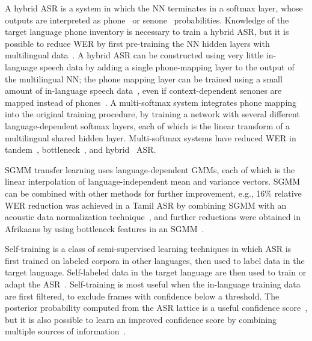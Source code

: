 A hybrid ASR is a system in which the NN terminates in a softmax
layer, whose outputs are interpreted as phone~\cite{Morgan95} or
senone~\cite{Dahl2012} probabilities.  Knowledge of the target
language phone inventory is necessary to train a hybrid ASR, but it is
possible to reduce WER by first pre-training the NN hidden layers with
multilingual data~\cite{Huang2013,Swietojanski2012}.  A hybrid ASR can be
constructed using very little in-language speech data by adding a
single phone-mapping layer to the output of the multilingual NN; the
phone mapping layer can be trained using a small amount of in-language
speech data~\cite{Sim2008}, even if context-dependent senones are
mapped instead of phones~\cite{Do2012}.  A multi-softmax system
integrates phone mapping into the original training procedure, by
training a network with several different language-dependent softmax
layers, each of which is the linear transform of a multilingual shared
hidden layer.  Multi-softmax systems have reduced WER in
tandem~\cite{Scanzio2008}, bottleneck~\cite{Vesely2012}, and
hybrid~\cite{Huang2013} ASR.

SGMM transfer learning uses language-dependent GMMs, each of which is
the linear interpolation of language-independent mean and variance
vectors.  SGMM can be combined with other methods for further
improvement, e.g., 16\% relative WER reduction was achieved in a Tamil
ASR by combining SGMM with an acoustic data normalization
technique~\cite{Mohan2014}, and further reductions were obtained in
Afrikaans by using bottleneck features in an SGMM~\cite{Imseng2014}.

Self-training is a class of semi-supervised learning techniques in
which ASR is first trained on labeled corpora in other languages, then
used to label data in the target language.  Self-labeled data in the
target language are then used to train or adapt the
ASR~\cite{Loof2009,Cetin2008}.  Self-training is most useful when the
in-language training data are first filtered, to exclude frames with
confidence below a threshold.  The posterior probability computed from
the ASR lattice is a useful confidence score~\cite{vesely2013-semi},
but it is also possible to learn an improved confidence score by
combining multiple sources of information~\cite{Vu2011b}.

